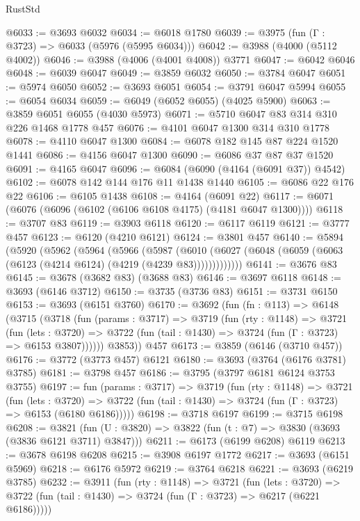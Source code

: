 \begin{lexlean}{RustStd}
\begin{coremodule}
@6033 := @3693 @6032
@6034 := @6018 @1780
@6039 := @3975 (fun (Γ : @3723) => @6033 (@5976 (@5995 @6034)))
@6042 := @3988 (@4000 (@5112 @4002))
@6046 := @3988 (@4006 (@4001 @4008)) @3771
@6047 := @6042 @6046
@6048 := @6039 @6047
@6049 := @3859 @6032
@6050 := @3784 @6047
@6051 := @5974 @6050
@6052 := @3693 @6051
@6054 := @3791 @6047 @5994
@6055 := @6054 @6034
@6059 := @6049 (@6052 @6055) (@4025 @5900)
@6063 := @3859 @6051 @6055 (@4030 @5973)
@6071 := @5710 @6047 @83 @314 @310 @226 @1468 @1778 @457
@6076 := @4101 @6047 @1300 @314 @310 @1778
@6078 := @4110 @6047 @1300
@6084 := @6078 @182 @145 @87 @224 @1520 @1441
@6086 := @4156 @6047 @1300
@6090 := @6086 @37 @87 @37 @1520
@6091 := @4165 @6047
@6096 := @6084 (@6090 (@4164 (@6091 @37)) @4542)
@6102 := @6078 @142 @144 @176 @11 @1438 @1440
@6105 := @6086 @22 @176 @22
@6106 := @6105 @1438
@6108 := @4164 (@6091 @22)
@6117 := @6071 (@6076 (@6096 (@6102 (@6106 @6108 @4175) (@4181 @6047 @1300))))
@6118 := @3707 @83
@6119 := @3903 @6118
@6120 := @6117 @6119
@6121 := @3777 @457
@6123 := @6120 (@4210 @6121)
@6124 := @3801 @457
@6140 := @5894
    (@5920
      (@5962
        (@5964
          (@5966
            (@5987
              (@6010 (@6027 (@6048 (@6059 (@6063 (@6123 (@4214 @6124) (@4219 (@4239 @83)))))))))))))
@6141 := @3676 @83
@6145 := @3678 (@3682 @83) (@3688 @83)
@6146 := @3697 @6118
@6148 := @3693 (@6146 @3712)
@6150 := @3735 (@3736 @83)
@6151 := @3731 @6150
@6153 := @3693 (@6151 @3760)
@6170 := @3692
    (fun (fn : @113) =>
    @6148
      (@3715
        (@3718
          (fun (params : @3717) =>
          @3719
            (fun (rty : @1148) =>
            @3721
              (fun (lets : @3720) =>
              @3722 (fun (tail : @1430) => @3724 (fun (Γ : @3723) => @6153 @3807))))))
        @3853))
    @457
@6173 := @3859 (@6146 (@3710 @457))
@6176 := @3772 (@3773 @457) @6121
@6180 := @3693 (@3764 (@6176 @3781) @3785)
@6181 := @3798 @457
@6186 := @3795 (@3797 @6181 @6124 @3753 @3755)
@6197 := fun (params : @3717) =>
  @3719
    (fun (rty : @1148) =>
    @3721
      (fun (lets : @3720) =>
      @3722 (fun (tail : @1430) => @3724 (fun (Γ : @3723) => @6153 (@6180 @6186)))))
@6198 := @3718 @6197
@6199 := @3715 @6198
@6208 := @3821 (fun (U : @3820) => @3822 (fun (t : @7) => @3830 (@3693 (@3836 @6121 @3711) @3847)))
@6211 := @6173 (@6199 @6208) @6119
@6213 := @3678 @6198 @6208
@6215 := @3908 @6197 @1772
@6217 := @3693 (@6151 @5969)
@6218 := @6176 @5972
@6219 := @3764 @6218
@6221 := @3693 (@6219 @3785)
@6232 := @3911
    (fun (rty : @1148) =>
    @3721
      (fun (lets : @3720) =>
      @3722 (fun (tail : @1430) => @3724 (fun (Γ : @3723) => @6217 (@6221 @6186)))))

\end{coremodule}
\end{lexlean}
